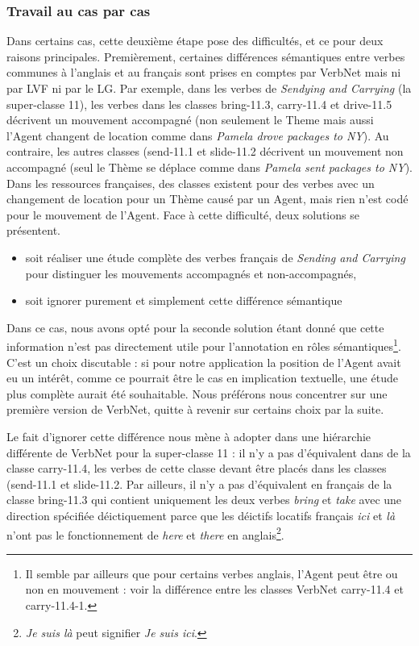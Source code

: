 \subsubsection{Travail au cas par cas}\label{subsubsec:casebycase}

Dans certains cas, cette deuxième étape pose des difficultés, et ce pour deux
raisons principales. Premièrement, certaines différences sémantiques entre
verbes communes à l'anglais et au français sont prises en comptes par VerbNet
mais ni par LVF ni par le LG. Par exemple, dans les verbes de \emph{Sendying
and Carrying} (la super-classe 11), les verbes dans les classes
{\color{blue}bring-11.3}, {\color{blue}carry-11.4} et {\color{blue}drive-11.5}
décrivent un mouvement accompagné (non seulement le Theme mais aussi l'Agent
changent de location comme dans \emph{Pamela drove packages to NY}). Au
contraire, les autres classes ({\color{blue}send-11.1} et
{\color{blue}slide-11.2} décrivent un mouvement non accompagné (seul le Thème
se déplace comme dans \emph{Pamela sent packages to NY}). Dans les ressources
françaises, des classes existent pour des verbes avec un changement de location
pour un Thème causé par un Agent, mais rien n'est codé pour le mouvement de
l'Agent. Face à cette difficulté, deux solutions se présentent.

\begin{itemize}
    \item soit réaliser une étude complète des verbes français de \emph{Sending
        and Carrying} pour distinguer les mouvements accompagnés et
        non-accompagnés,
    \item soit ignorer purement et simplement cette différence sémantique
\end{itemize}

Dans ce cas, nous avons opté pour la seconde solution étant donné que cette
information n'est pas directement utile pour l'annotation en rôles
sémantiques\footnote{Il semble par ailleurs que pour certains verbes anglais,
    l'Agent peut être ou non en mouvement : voir la différence entre les
classes VerbNet {\color{blue}carry-11.4} et {\color{blue}carry-11.4-1}.}.
C'est un choix discutable : si pour notre application la position de l'Agent
avait eu un intérêt, comme ce pourrait être le cas en implication textuelle,
une étude plus complète aurait été souhaitable. Nous préférons nous concentrer
sur une première version de VerbNet, quitte à revenir sur certains choix par la
suite.

Le fait d'ignorer cette différence nous mène à adopter dans \verbenet{} une
hiérarchie différente de VerbNet pour la super-classe 11 : il n'y a pas
d'équivalent dans \verbenet{} de la classe {\color{blue}carry-11.4}, les verbes
de cette classe devant être placés dans les classes ({\color{blue}send-11.1} et
{\color{blue}slide-11.2}. Par ailleurs, il n'y a pas d'équivalent en français
de la classe {\color{blue}bring-11.3} qui contient uniquement les deux verbes
\emph{bring} et \emph{take} avec une direction spécifiée déictiquement
\citep[page 135]{levin1993english} parce que les déictifs locatifs français
\emph{ici} et \emph{là} n'ont pas le fonctionnement de \emph{here} et
\emph{there} en anglais\footnote{\emph{Je suis là} peut signifier \emph{Je suis
ici}.}.

